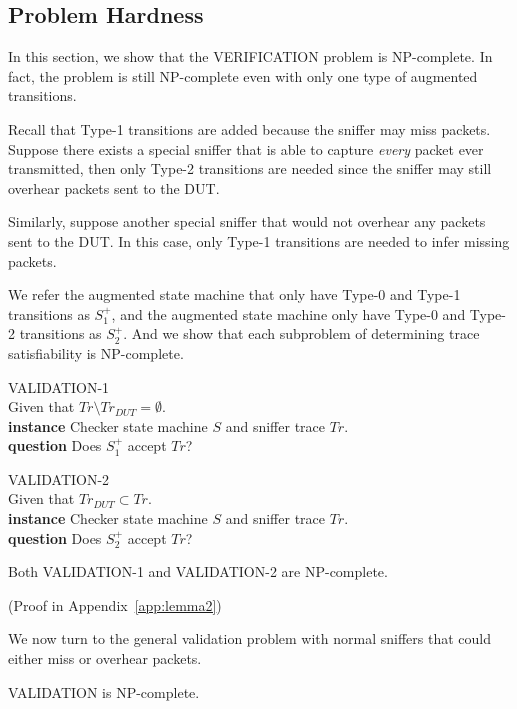 \subsection{Problem Hardness}
\label{subsec:hard}

In this section, we show that the VERIFICATION problem is NP-complete. In
fact, the problem is still NP-complete even with only one type of augmented
transitions.

Recall that Type-1 transitions are added because the sniffer may miss packets.
Suppose there exists a special sniffer that is able to capture \textit{every}
packet ever transmitted, then only Type-2 transitions are needed since the
sniffer may still overhear packets sent to the DUT.

Similarly, suppose another special sniffer that would not overhear any packets
sent to the DUT. In this case, only Type-1 transitions are needed to infer
missing packets.

We refer the augmented state machine that only have Type-0 and Type-1
transitions as $S^+_1$, and the augmented state machine only have Type-0 and
Type-2 transitions as $S^+_2$. And we show that each subproblem of determining
trace satisfiability is NP-complete.

\begin{problem}
  VALIDATION-1\\
  Given that $Tr\setminus Tr_{DUT}=\emptyset$.\\
  \textbf{instance} Checker state machine $S$ and sniffer trace $Tr$.\\
  \textbf{question} Does $S^+_1$ accept $Tr$?
\end{problem}

\begin{problem}
  VALIDATION-2\\
  Given that $Tr_{DUT} \subset Tr$.\\
  \textbf{instance} Checker state machine $S$ and sniffer trace $Tr$.\\
  \textbf{question} Does $S^+_2$ accept $Tr$?
\end{problem}

\begin{lemma}
  Both VALIDATION-1 and VALIDATION-2 are NP-complete.
\end{lemma}%
(Proof in Appendix~\ref{app:lemma2})

We now turn to the general validation problem with normal sniffers that could
either miss or overhear packets.

\begin{theorem}
  VALIDATION is NP-complete.
\end{theorem}
